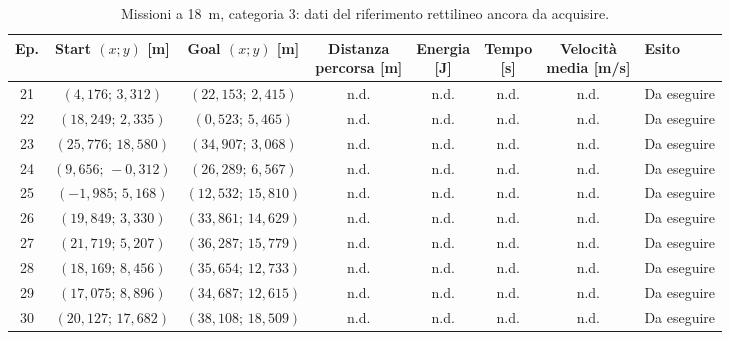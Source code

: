 \begin{table}[H]
\centering
\caption{Missioni a 18~m, categoria 3: dati del riferimento rettilineo ancora da acquisire.}
\label{tab:big-map-18m-baseline-cat3}
\begingroup
\fontsize{9}{11}\selectfont
\setlength{\tabcolsep}{2.5pt}
\renewcommand{\arraystretch}{1.2}
\begin{tabular}{@{}c cc cccc l@{}}
\toprule
Ep. & \shortstack{Start $(x;y)$\\{}[m]} & \shortstack{Goal $(x;y)$\\{}[m]} & \shortstack{Distanza\\percorsa [m]} & \shortstack{Energia\\{}[J]} & \shortstack{Tempo\\{}[s]} & \shortstack{Velocità\\media [m/s]} & Esito \\
\midrule
21 & $(4{,}176;\,3{,}312)$ & $(22{,}153;\,2{,}415)$ & n.d. & n.d. & n.d. & n.d. & Da eseguire \\
22 & $(18{,}249;\,2{,}335)$ & $(0{,}523;\,5{,}465)$ & n.d. & n.d. & n.d. & n.d. & Da eseguire \\
23 & $(25{,}776;\,18{,}580)$ & $(34{,}907;\,3{,}068)$ & n.d. & n.d. & n.d. & n.d. & Da eseguire \\
24 & $(9{,}656;\,-0{,}312)$ & $(26{,}289;\,6{,}567)$ & n.d. & n.d. & n.d. & n.d. & Da eseguire \\
25 & $(-1{,}985;\,5{,}168)$ & $(12{,}532;\,15{,}810)$ & n.d. & n.d. & n.d. & n.d. & Da eseguire \\
26 & $(19{,}849;\,3{,}330)$ & $(33{,}861;\,14{,}629)$ & n.d. & n.d. & n.d. & n.d. & Da eseguire \\
27 & $(21{,}719;\,5{,}207)$ & $(36{,}287;\,15{,}779)$ & n.d. & n.d. & n.d. & n.d. & Da eseguire \\
28 & $(18{,}169;\,8{,}456)$ & $(35{,}654;\,12{,}733)$ & n.d. & n.d. & n.d. & n.d. & Da eseguire \\
29 & $(17{,}075;\,8{,}896)$ & $(34{,}687;\,12{,}615)$ & n.d. & n.d. & n.d. & n.d. & Da eseguire \\
30 & $(20{,}127;\,17{,}682)$ & $(38{,}108;\,18{,}509)$ & n.d. & n.d. & n.d. & n.d. & Da eseguire \\
\bottomrule
\end{tabular}
\endgroup
\end{table}

